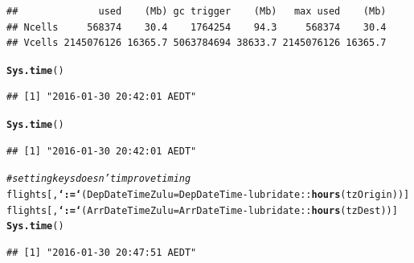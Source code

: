 \documentclass{scrreprt}\usepackage[]{graphicx}\usepackage[]{color}
\makeatletter
\newcommand{\hlcom}[1]{\textcolor[rgb]{0.678,0.584,0.686}{\textit{#1}}}%
\newcommand{\hlopt}[1]{\textcolor[rgb]{0,0,0}{#1}}%
\newcommand{\hlstd}[1]{\textcolor[rgb]{0.345,0.345,0.345}{#1}}%
\newcommand{\hlkwc}[1]{\textcolor[rgb]{0.333,0.667,0.333}{#1}}%
\newcommand{\hlkwd}[1]{\textcolor[rgb]{0.737,0.353,0.396}{\textbf{#1}}}%
\newenvironment{kframe}{%
 \def\at@end@of@kframe{}%
 \ifinner\ifhmode%
  \def\at@end@of@kframe{\end{minipage}}%
  \begin{minipage}{\columnwidth}%
 \fi\fi%
 \def\FrameCommand##1{\hskip\@totalleftmargin \hskip-\fboxsep
 \colorbox{shadecolor}{##1}\hskip-\fboxsep
     \hskip-\linewidth \hskip-\@totalleftmargin \hskip\columnwidth}%
 \MakeFramed {\advance\hsize-\width
   \@totalleftmargin\z@ \linewidth\hsize
   \@setminipage}}%
 {\par\unskip\endMakeFramed%
 \at@end@of@kframe}
\newenvironment{knitrout}{}{} %
\makeatother
\begin{document}
\begin{knitrout}
\begin{kframe}
\begin{alltt}
\end{alltt}
\begin{verbatim}
##              used    (Mb) gc trigger    (Mb)   max used    (Mb)
## Ncells     568374    30.4    1764254    94.3     568374    30.4
## Vcells 2145076126 16365.7 5063784694 38633.7 2145076126 16365.7
\end{verbatim}
\begin{alltt}
\hlkwd{Sys.time}\hlstd{()}
\end{alltt}
\begin{verbatim}
## [1] "2016-01-30 20:42:01 AEDT"
\end{verbatim}
\end{kframe}
\end{knitrout}

\begin{knitrout}
\color{fgcolor}\begin{kframe}
\begin{alltt}
\hlkwd{Sys.time}\hlstd{()}
\end{alltt}
\begin{verbatim}
## [1] "2016-01-30 20:42:01 AEDT"
\end{verbatim}
\begin{alltt}
\hlcom{# setting keys doesn't improve timing}
\hlstd{flights[,}\hlkwd{`:=`}\hlstd{(}\hlkwc{DepDateTimeZulu} \hlstd{= DepDateTime} \hlopt{-} \hlstd{lubridate}\hlopt{::}\hlkwd{hours}\hlstd{(tzOrigin))]}
\hlstd{flights[,}\hlkwd{`:=`}\hlstd{(}\hlkwc{ArrDateTimeZulu} \hlstd{= ArrDateTime} \hlopt{-} \hlstd{lubridate}\hlopt{::}\hlkwd{hours}\hlstd{(tzDest))]}
\hlkwd{Sys.time}\hlstd{()}
\end{alltt}
\begin{verbatim}
## [1] "2016-01-30 20:47:51 AEDT"
\end{verbatim}
\end{kframe}
\end{knitrout}
\end{document}
